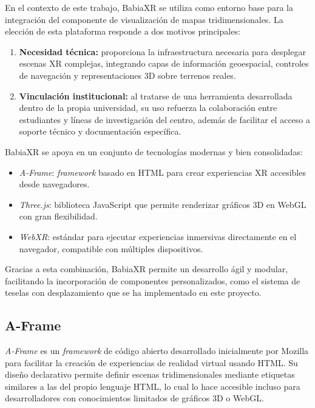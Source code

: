 \documentclass[a4paper, 12pt]{book}
\begin{document}
En el contexto de este trabajo, BabiaXR se utiliza como entorno base para la integración del componente de visualización de mapas tridimensionales. La elección de esta plataforma responde a dos motivos principales:

\begin{enumerate}
  \item \textbf{Necesidad técnica:} proporciona la infraestructura necesaria para desplegar escenas XR complejas, integrando capas de información geoespacial, controles de navegación y representaciones 3D sobre terrenos reales.
  \item \textbf{Vinculación institucional:} al tratarse de una herramienta desarrollada dentro de la propia universidad, su uso refuerza la colaboración entre estudiantes y líneas de investigación del centro, además de facilitar el acceso a soporte técnico y documentación específica.
\end{enumerate}

BabiaXR se apoya en un conjunto de tecnologías modernas y bien consolidadas:
\begin{itemize}
  \item \textit{A-Frame}: \textit{framework} basado en HTML para crear experiencias XR accesibles desde navegadores.
  \item \textit{Three.js}: biblioteca JavaScript que permite renderizar gráficos 3D en WebGL con gran flexibilidad.
  \item \textit{WebXR}: estándar para ejecutar experiencias inmersivas directamente en el navegador, compatible con múltiples dispositivos.
\end{itemize}

Gracias a esta combinación, BabiaXR permite un desarrollo ágil y modular, facilitando la incorporación de componentes personalizados, como el sistema de teselas con desplazamiento que se ha implementado en este proyecto.


\subsection{A-Frame}
\label{subsec:aframe}

\textit{A-Frame} es un \textit{framework} de código abierto desarrollado inicialmente por Mozilla para facilitar la creación de experiencias de realidad virtual usando HTML. Su diseño declarativo permite definir escenas tridimensionales mediante etiquetas similares a las del propio lenguaje HTML, lo cual lo hace accesible incluso para desarrolladores con conocimientos limitados de gráficos 3D o WebGL.
\end{document}
